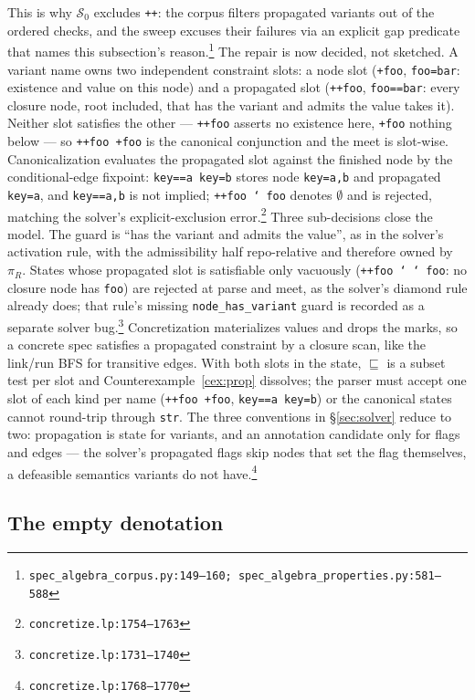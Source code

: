 \documentclass[11pt]{article}
\theoremstyle{definition}
\theoremstyle{remark}
\newcommand{\sat}{\sqsubseteq}
\newcommand{\Spec}{\mathcal{S}}
\newcommand{\code}[1]{\texttt{#1}}
\newcommand{\src}[1]{\footnote{\code{#1}}}
\begin{document}
This is why $\Spec_0$ excludes \code{++}: the corpus filters propagated
variants out of the ordered checks, and the sweep excuses their failures via
an explicit gap predicate that names this
subsection's reason.\src{spec\_algebra\_corpus.py:149--160;
spec\_algebra\_properties.py:581--588}  The repair is now decided, not
sketched.  A variant name owns two independent constraint slots: a node
slot (\code{+foo}, \code{foo=bar}: existence and value on this node) and a
propagated slot (\code{++foo}, \code{foo==bar}: every closure node, root
included, that has the variant and admits the value takes it).  Neither
slot satisfies the other --- \code{++foo} asserts no existence here,
\code{+foo} nothing below --- so \code{++foo +foo} is the canonical
conjunction and the meet is slot-wise.  Canonicalization evaluates the
propagated slot against the finished node by the conditional-edge fixpoint:
\code{key==a key=b} stores node \code{key=a,b} and propagated
\code{key=a}, and \code{key==a,b} is not implied; \code{++foo \char`~foo}
denotes $\emptyset$ and is rejected, matching the solver's
explicit-exclusion error.\src{concretize.lp:1754--1763}  Three
sub-decisions close the model.  The guard is ``has the variant and admits
the value'', as in the solver's activation rule, with the admissibility
half repo-relative and therefore owned by $\pi_R$.  States whose propagated
slot is satisfiable only vacuously (\code{++foo \char`~\char`~foo}: no
closure node has \code{foo}) are rejected at parse and meet, as the
solver's diamond rule already does; that rule's missing
\code{node\_has\_variant} guard is recorded as a separate solver
bug.\src{concretize.lp:1731--1740}  Concretization materializes values and
drops the marks, so a concrete spec satisfies a propagated constraint by a
closure scan, like the link/run BFS for transitive edges.  With both slots
in the state, $\sat$ is a subset test per slot and
Counterexample~\ref{cex:prop} dissolves; the parser must accept one slot of
each kind per name (\code{++foo +foo}, \code{key==a key=b}) or the
canonical states cannot round-trip through \code{str}.  The three
conventions in \S\ref{sec:solver} reduce to two: propagation is state for
variants, and an annotation candidate only for flags and edges --- the
solver's propagated flags skip nodes that set the flag themselves, a
defeasible semantics variants do not have.\src{concretize.lp:1768--1770}

\subsection{The empty denotation}\label{sec:empty}
\end{document}
